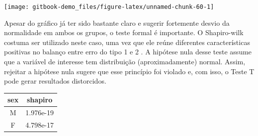 \documentclass[
]{book}
\newenvironment{Shaded}{\begin{snugshade}}{\end{snugshade}}
\newcommand{\DataTypeTok}[1]{\textcolor[rgb]{0.13,0.29,0.53}{#1}}
\newcommand{\DecValTok}[1]{\textcolor[rgb]{0.00,0.00,0.81}{#1}}
\newcommand{\KeywordTok}[1]{\textcolor[rgb]{0.13,0.29,0.53}{\textbf{#1}}}
\newcommand{\NormalTok}[1]{#1}
\newcommand{\OperatorTok}[1]{\textcolor[rgb]{0.81,0.36,0.00}{\textbf{#1}}}
\newcommand{\StringTok}[1]{\textcolor[rgb]{0.31,0.60,0.02}{#1}}
\begin{document}
\begin{center}\texttt{[image: gitbook-demo\_files/figure-latex/unnamed-chunk-60-1]} \end{center}

Apesar do gráfico já ter sido bastante claro e sugerir fortemente desvio da normalidade em ambos os grupos, o teste formal é importante. O Shapiro-wilk costuma ser utilizado neste caso, uma vez que ele reúne diferentes características positivas no balanço entre erro do tipo 1 e 2 \citep{Yap2011}. A hipótese nula desse teste assume que a variável de interesse tem distribuição (aproximadamente) normal. Assim, rejeitar a hipótese nula sugere que esse princípio foi violado e, com isso, o Teste T pode gerar resultados distorcidos.

\begin{Shaded}
\end{Shaded}

\begin{longtable}[]{@{}cc@{}}
\toprule
\begin{minipage}[b]{0.08\columnwidth}\centering
sex\strut
\end{minipage} & \begin{minipage}[b]{0.16\columnwidth}\centering
shapiro\strut
\end{minipage}\tabularnewline
\midrule
\endhead
\begin{minipage}[t]{0.08\columnwidth}\centering
M\strut
\end{minipage} & \begin{minipage}[t]{0.16\columnwidth}\centering
1.976e-19\strut
\end{minipage}\tabularnewline
\begin{minipage}[t]{0.08\columnwidth}\centering
F\strut
\end{minipage} & \begin{minipage}[t]{0.16\columnwidth}\centering
4.798e-17\strut
\end{minipage}\tabularnewline
\bottomrule
\end{longtable}
\end{document}
